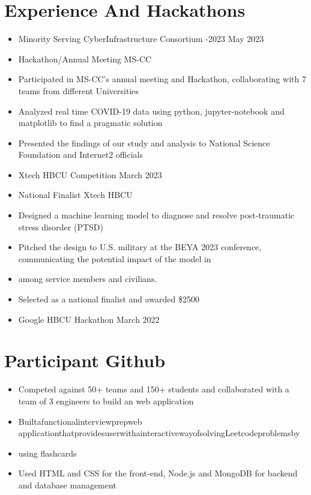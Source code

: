 \documentclass[letterpaper,10pt]{article}
\begin{document}
\section{Experience And Hackathons}
\begin{itemize}
  \item Minority Serving CyberInfrastructure Consortium -2023 May 2023
  \item Hackathon/Annual Meeting MS-CC
  \item Participated in MS-CC’s annual meeting and Hackathon, collaborating with 7 teams from different Universities
  \item Analyzed real time COVID-19 data using python, jupyter-notebook and matplotlib to find a pragmatic solution
  \item Presented the findings of our study and analysis to National Science Foundation and Internet2 officials
  \item Xtech HBCU Competition March 2023
  \item National Finalist Xtech HBCU
  \item Designed a machine learning model to diagnose and resolve post-traumatic stress disorder (PTSD)
  \item Pitched the design to U.S. military at the BEYA 2023 conference, communicating the potential impact of the model in
  \item among service members and civilians.
  \item Selected as a national finalist and awarded \$2500
  \item Google HBCU Hackathon March 2022
\end{itemize}





\section{Participant Github}
\begin{itemize}
  \item Competed against 50+ teams and 150+ students and collaborated with a team of 3 engineers to build an web application
  \item Builtafunctionalinterviewprepweb applicationthatprovidesuserwithainteractivewayofsolvingLeetcodeproblemsby
  \item using flashcards
  \item Used HTML and CSS for the front-end, Node.js and MongoDB for backend and database management
\end{itemize}
\end{document}
